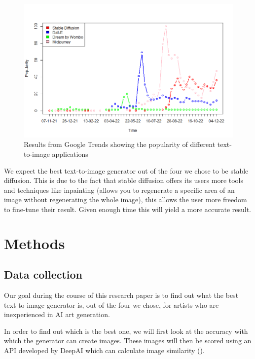 \documentclass[]{report}
\begin{document}
	\begin{figure}[!h]
		\centering
		\includegraphics[width=1\linewidth]{TrendsPlotWithLegend}
		\caption{Results from Google Trends showing the popularity of different text-to-image applications}
		\label{fig:TrendsPlotWithLegend}
	\end{figure}
	
	
	We expect the best text-to-image generator out of the four we chose to be stable diffusion. This is due to the fact that stable diffusion offers its users more tools and techniques like inpainting (allows you to regenerate a specific area of an image without regenerating the whole image), this allows the user more freedom to fine-tune their result. Given enough time this will yield a more accurate result.
	
	\pagebreak
	
	\section{Methods}
	
	\subsection{Data collection}
	Our goal during the course of this research paper is to find out what the best text to image generator is, out of the four we chose, for artists who are inexperienced in AI art generation.
	
	In order to find out which is the best one, we will first look at the accuracy with which the generator can create images. These images will then be scored using an API developed by DeepAI which can calculate image similarity (\cite{imageSimilarity}). 
	
\end{document}
